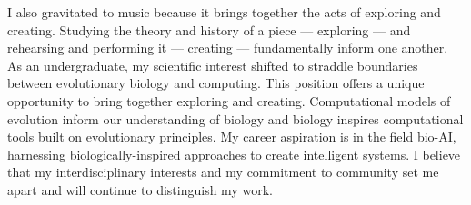 I also gravitated to music because it brings together the acts of exploring and creating.
Studying the theory and history of a piece --- exploring --- and rehearsing and performing it --- creating --- fundamentally inform one another.
As an undergraduate, my scientific interest shifted to straddle boundaries between evolutionary biology and computing.
This position offers a unique opportunity to bring together exploring and creating.
Computational models of evolution inform our understanding of biology and biology inspires computational tools built on evolutionary principles.
My career aspiration is in the field bio-AI, harnessing biologically-inspired approaches to create intelligent systems.
I believe that my interdisciplinary interests and my commitment to community set me apart and will continue to distinguish my work.
